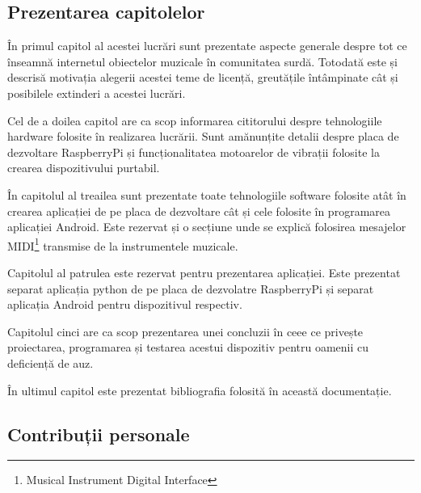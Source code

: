 \documentclass[../IoMusT.tex]{subfiles}
\begin{document}
\subsection{Prezentarea capitolelor}
În primul capitol al acestei lucrări sunt prezentate aspecte generale des\-pre tot ce înseamnă internetul obiectelor muzicale în comunitatea surdă. Tot\-o\-da\-tă este și descrisă motivația alegerii acestei teme de licență, greutățile întâmpinate cât și posibilele extinderi a acestei lucrări.
\\
\par Cel de a doilea capitol are ca scop informarea cititorului despre tehnologiile hardware folosite în realizarea lucrării. Sunt amănunțite detalii despre placa de dezvoltare RaspberryPi și funcționalitatea motoarelor de vibrații folosite la crearea dispozitivului purtabil.
\\
\par În capitolul al treailea sunt prezentate toate tehnologiile software folosite atât în crearea aplicației de pe placa de dezvoltare cât și cele folosite în programarea aplicației Android. Este rezervat și o secțiune unde se explică folosirea mesajelor MIDI\footnote{Musical Instrument Digital Interface} transmise de la instrumentele muzicale.
\\
\par Capitolul al patrulea este rezervat pentru prezentarea aplicației. Este prezentat separat aplicația python de pe placa de dezvolatre RaspberryPi și separat aplicația Android pentru dispozitivul respectiv.
\\
\par Capitolul cinci are ca scop prezentarea unei concluzii în ceee ce privește proiectarea, programarea și testarea acestui dispozitiv pentru oamenii cu deficiență de auz.
\\
\par În ultimul capitol este prezentat bibliografia folosită în această documentație.
\subsection{Contribuții personale}
\end{document}

